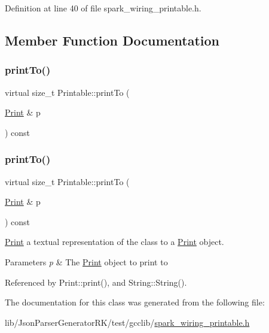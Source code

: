 Definition at line 40 of file spark\+\_\+wiring\+\_\+printable.\+h.



\subsection{Member Function Documentation}
\mbox{\label{class_printable_a2c5776bc55c0a3a5675bba9d4d8e3681}} 
\subsubsection{\texorpdfstring{print\+To()}{printTo()}\hspace{0.1cm}{\footnotesize\ttfamily [1/2]}}
{\footnotesize\ttfamily virtual size\+\_\+t Printable\+::print\+To (\begin{DoxyParamCaption}\item[{\hyperlink{class_print}{Print} \&}]{p }\end{DoxyParamCaption}) const\hspace{0.3cm}{\ttfamily [pure virtual]}}

\mbox{\label{class_printable_a2c5776bc55c0a3a5675bba9d4d8e3681}} 
\subsubsection{\texorpdfstring{print\+To()}{printTo()}\hspace{0.1cm}{\footnotesize\ttfamily [2/2]}}
{\footnotesize\ttfamily virtual size\+\_\+t Printable\+::print\+To (\begin{DoxyParamCaption}\item[{\hyperlink{class_print}{Print} \&}]{p }\end{DoxyParamCaption}) const\hspace{0.3cm}{\ttfamily [pure virtual]}}



\hyperlink{class_print}{Print} a textual representation of the class to a \hyperlink{class_print}{Print} object. 


\begin{DoxyParams}{Parameters}
{\em p} & The \hyperlink{class_print}{Print} object to print to \\
\hline
\end{DoxyParams}


Referenced by Print\+::print(), and String\+::\+String().



The documentation for this class was generated from the following file\+:\begin{DoxyCompactItemize}
\item 
lib/\+Json\+Parser\+Generator\+R\+K/test/gcclib/\hyperlink{test_2gcclib_2spark__wiring__printable_8h}{spark\+\_\+wiring\+\_\+printable.\+h}\end{DoxyCompactItemize}

